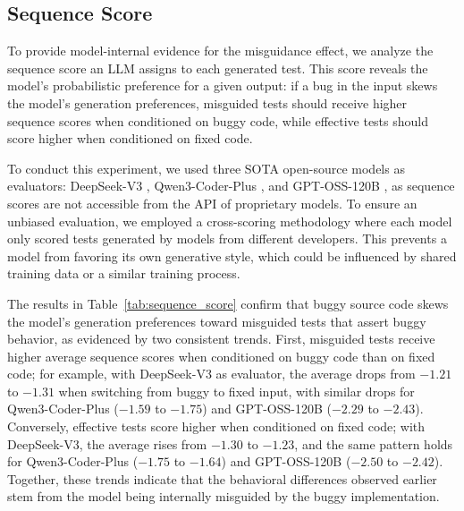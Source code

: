 \documentclass[acmsmall]{acmart}
\begin{document}
\subsection{Sequence Score}

To provide model-internal evidence for the misguidance effect, we analyze the sequence score an LLM assigns to each generated test. This score reveals the model's probabilistic preference \cite{LMareFew-Shot-Learner, DetectGPT, Holtzman2020TheCuriousCase} for a given output: if a bug in the input skews the model's generation preferences, misguided tests should receive higher sequence scores when conditioned on buggy code, while effective tests should score higher when conditioned on fixed code.

To conduct this experiment, we used three SOTA open-source models as evaluators: DeepSeek-V3 \cite{deepseekai2025deepseekv3technicalreport}, Qwen3-Coder-Plus \cite{alibaba2025qwen3coder}, and GPT-OSS-120B \cite{openai2025gptoss120bgptoss20bmodel}, as sequence scores are not accessible from the API of proprietary models. To ensure an unbiased evaluation, we employed a cross-scoring methodology where each model only scored tests generated by models from different developers. This prevents a model from favoring its own generative style, which could be influenced by shared training data or a similar training process.

The results in Table~\ref{tab:sequence_score} confirm that buggy source code skews the model's generation preferences toward misguided tests that assert buggy behavior, as evidenced by two consistent trends. First, misguided tests receive higher average sequence scores when conditioned on buggy code than on fixed code; for example, with DeepSeek-V3 as evaluator, the average drops from $-1.21$ to $-1.31$ when switching from buggy to fixed input, with similar drops for Qwen3-Coder-Plus ($-1.59$ to $-1.75$) and GPT-OSS-120B ($-2.29$ to $-2.43$). Conversely, effective tests score higher when conditioned on fixed code; with DeepSeek-V3, the average rises from $-1.30$ to $-1.23$, and the same pattern holds for Qwen3-Coder-Plus ($-1.75$ to $-1.64$) and GPT-OSS-120B ($-2.50$ to $-2.42$). Together, these trends indicate that the behavioral differences observed earlier stem from the model being internally misguided by the buggy implementation.
\end{document}
